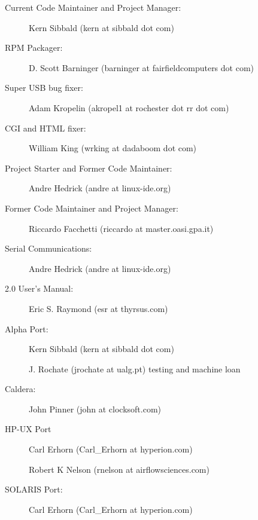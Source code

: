 {{{{{{{{{{{{\begin{description}

\item [Current Code Maintainer and Project Manager:]
   Kern Sibbald (kern at sibbald dot com)  

\item [RPM Packager:]
   D. Scott Barninger (barninger at fairfieldcomputers dot com)  

\item [Super USB bug fixer:]
   Adam Kropelin (akropel1 at rochester dot rr dot com)  

\item [CGI and HTML fixer:]
   William King (wrking at dadaboom dot com)  

\item [Project Starter and Former Code Maintainer:]
   Andre Hedrick (andre at linux-ide.org)  

\item [Former Code Maintainer and Project Manager:]
   Riccardo Facchetti (riccardo at master.oasi.gpa.it)  

\item [Serial Communications:]
   Andre Hedrick (andre at linux-ide.org)  

\item [2.0 User's Manual:]
   Eric S. Raymond (esr at thyrsus.com)  

\item [Alpha Port:]
   Kern Sibbald (kern at sibbald dot com)  

J. Rochate (jrochate at ualg.pt) testing and machine loan  

\item [Caldera:]
   John Pinner (john at clocksoft.com)  

\item [HP-UX Port]
   Carl Erhorn (Carl\_Erhorn at hyperion.com)  

Robert K Nelson (rnelson at airflowsciences.com)  

\item [SOLARIS Port:]
   Carl Erhorn (Carl\_Erhorn at hyperion.com)  


\end{description}}}}}}}}}}}}}
